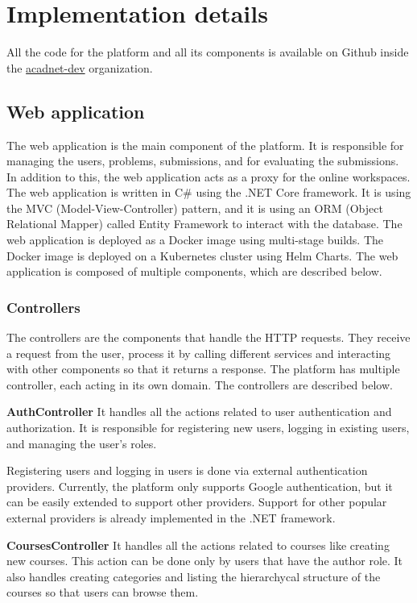 \documentclass[12pt,a4paper]{report}
\begin{document}
\chapter{Implementation details}
All the code for the platform and all its components is available on Github inside the \href{https://github.com/acadnet-dev}{acadnet-dev} organization.

\section{Web application}
The web application is the main component of the platform. It is responsible for managing the users, problems, submissions, and for evaluating the submissions. In addition to this, the web application acts as a proxy for the online workspaces. The web application is written in C\# using the .NET Core framework. It is using the MVC (Model-View-Controller) pattern, and it is using an ORM (Object Relational Mapper) called Entity Framework to interact with the database. The web application is deployed as a Docker image using multi-stage builds. The Docker image is deployed on a Kubernetes cluster using Helm Charts. The web application is composed of multiple components, which are described below.

\subsection{Controllers}
The controllers are the components that handle the HTTP requests. They receive a request from the user, process it by calling different services and interacting with other components so that it returns a response. The platform has multiple controller, each acting in its own domain. The controllers are described below.

\textbf{AuthController}
It handles all the actions related to user authentication and authorization. It is responsible for registering new users, logging in existing users, and managing the user's roles.

Registering users and logging in users is done via external authentication providers. Currently, the platform only supports Google authentication, but it can be easily extended to support other providers. Support for other popular external providers is already implemented in the .NET framework.

\textbf{CoursesController}
It handles all the actions related to courses like creating new courses. This action can be done only by users that have the author role. It also handles creating categories and listing the hierarchycal structure of the courses so that users can browse them.
\end{document}
